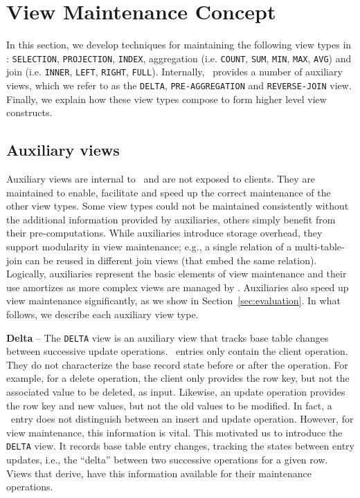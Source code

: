 \section{View Maintenance Concept} 
\label{sec:view_maintenance} 

In this section, we develop techniques for maintaining the following
view types in \VMS: \texttt{SELECTION}, \texttt{PROJECTION},
\texttt{INDEX}, aggregation (i.e. \texttt{COUNT}, \texttt{SUM},
\texttt{MIN}, \texttt{MAX}, \texttt{AVG}) and join
(i.e. \texttt{INNER}, \texttt{LEFT}, \texttt{RIGHT},
\texttt{FULL}). Internally, \VMS\ provides a number of auxiliary
views, which we refer to as the \texttt{DELTA},
\texttt{PRE-AGGREGATION} and \texttt{REVERSE-JOIN} view. Finally, we
explain how these view types compose to form higher level view
constructs. 

\subsection{Auxiliary views}
\label{subsec:auxiliary_views}

Auxiliary views are internal to \VMS\ and are not exposed to
clients. They are maintained to enable, facilitate and speed up the
correct maintenance of the other view types. Some view types could not
be maintained consistently without the additional information provided
by auxiliaries, others simply benefit from their
pre-computations. While auxiliaries introduce storage overhead, they
support modularity in view maintenance; e.g., a single relation of a
multi-table-join can be reused in different join views (that embed the
same relation). Logically, auxiliaries represent the basic elements of
view maintenance and their use amortizes as more complex views are
managed by \VMS.  Auxiliaries also speed up view maintenance
significantly, as we show in Section~\ref{sec:evaluation}.  In what 
follows, we describe each auxiliary view type.




\noindent  
\textbf{Delta} -- The \texttt{DELTA} view is an auxiliary view that
tracks base table changes between successive update operations.  
\TL\ entries only contain the client operation.
They do not characterize the base record state before or after the
operation. For example, for a delete operation, the client only provides
the row key, but not the associated value to be deleted, as input.
Likewise, an update operation provides the row key and new values, but
not the old values to be modified. In fact, a \TL\ entry does not
distinguish between an insert and update operation. However, for view 
maintenance, this information is vital. This motivated us to introduce 
the \texttt{DELTA} view. It records base table entry changes, tracking 
the states between entry updates, i.e., the ``delta'' between two 
successive operations for a given row.  Views that derive, have this 
information available for their maintenance operations.

